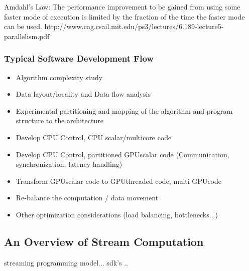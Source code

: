 



Amdahl's Law: The performance improvement to be gained from using some faster
mode of execution is limited by the fraction of the time the faster mode can be
used.
http://www.cag.csail.mit.edu/ps3/lectures/6.189-lecture5-parallelism.pdf


\subsubsection{Typical Software Development Flow} %
\label{ssub:typical_software_development_flow}
\begin{itemize}
	\item Algorithm complexity study
	\item Data layout/locality and Data flow analysis
	\item Experimental partitioning and mapping of the algorithm and program 
		structure to the architecture
	\item Develop CPU Control, CPU scalar/multicore code
	\item Develop CPU Control, partitioned \gls{GPU}scalar code (Communication, 
		synchronization, latency handling)
	\item Transform \gls{GPU}scalar code to \gls{GPU}threaded code, multi \gls{GPU}code
	\item Re-balance the computation / data movement
	\item Other optimization considerations (load balancing, bottlenecks...)
\end{itemize}


\subsection{An Overview of Stream Computation} %
\label{sub:an_overview_of_stream_computation}
streaming programming model... sdk's .. 

